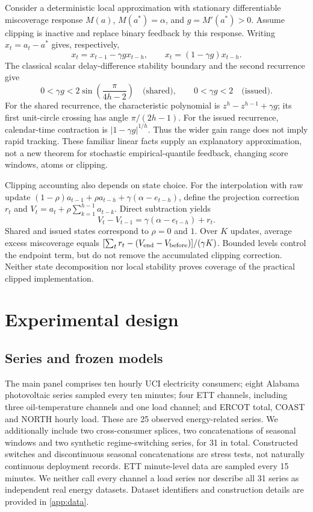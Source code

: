 \documentclass[preprint,11pt]{elsarticle}
\begin{document}
Consider a deterministic local approximation with stationary differentiable
miscoverage response $M(a)$, $M(a^*)=\alpha$, and $g=M'(a^*)>0$. Assume clipping
is inactive and replace binary feedback by this response. Writing $x_t=a_t-a^*$
gives, respectively,
\begin{equation}
 x_t=x_{t-1}-\gamma g x_{t-h},\qquad
 x_t=(1-\gamma g)x_{t-h}.
\end{equation}
The classical scalar delay-difference stability boundary \citep{deger2017stability}
and the second recurrence give
\begin{equation}\label{eq:stability}
 0<\gamma g<2\sin\!\left(\frac{\pi}{4h-2}\right)\quad\text{(shared)},
 \qquad 0<\gamma g<2\quad\text{(issued)}.
\end{equation}
For the shared recurrence, the characteristic polynomial is
$z^h-z^{h-1}+\gamma g$; its first unit-circle crossing has angle
$\pi/(2h-1)$. For the issued recurrence, calendar-time contraction is
$|1-\gamma g|^{1/h}$. Thus the wider gain range does not imply rapid tracking.
These familiar linear facts supply an explanatory approximation, not a new theorem
for stochastic empirical-quantile feedback, changing score windows, atoms or clipping.

Clipping accounting also depends on state choice. For the interpolation with raw update
$(1-\rho)a_{t-1}+\rho a_{t-h}+\gamma(\alpha-e_{t-h})$, define the projection correction
$r_t$ and $V_t=a_t+\rho\sum_{k=1}^{h-1}a_{t-k}$. Direct subtraction yields
\begin{equation}\label{eq:potential}
 V_t-V_{t-1}=\gamma(\alpha-e_{t-h})+r_t.
\end{equation}
Shared and issued states correspond to $\rho=0$ and $1$. Over $K$ updates,
average excess miscoverage equals
$[\sum_t r_t-(V_{\rm end}-V_{\rm before})]/(\gamma K)$.
Bounded levels control the endpoint term, but do not remove the accumulated clipping
correction. Neither state decomposition nor local stability proves coverage of the
practical clipped implementation.

\section{Experimental design}
\subsection{Series and frozen models}
The main panel comprises ten hourly UCI electricity consumers; eight Alabama photovoltaic
series sampled every ten minutes; four ETT channels, including three oil-temperature
channels and one load channel; and ERCOT total, COAST and NORTH hourly load. These are
25 observed energy-related series. We additionally include two cross-consumer splices,
two concatenations of seasonal windows and two synthetic regime-switching series, for
31 in total. Constructed switches and discontinuous seasonal concatenations are stress
tests, not naturally continuous deployment records. ETT minute-level data are sampled
every 15 minutes. We neither call every channel a load series nor describe all 31 series
as independent real energy datasets. Dataset identifiers and construction details are
provided in \ref{app:data}.
\end{document}
